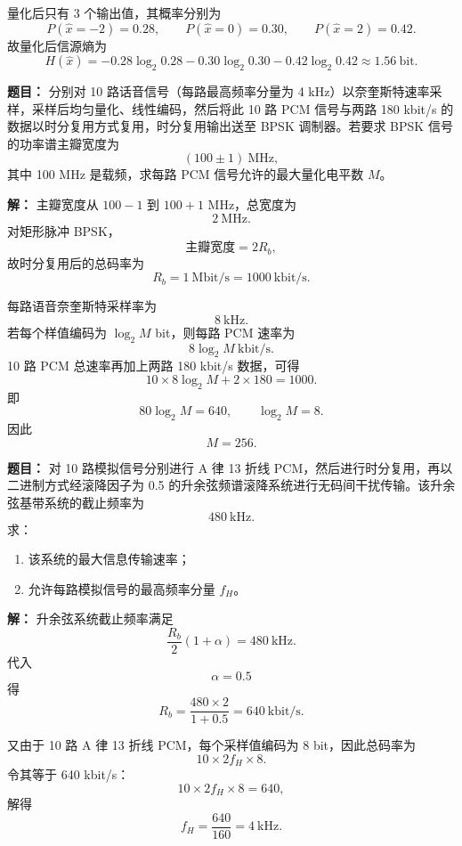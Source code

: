 量化后只有 3 个输出值，其概率分别为
\[
P(\hat x=-2)=0.28,\qquad P(\hat x=0)=0.30,\qquad P(\hat x=2)=0.42.
\]
故量化后信源熵为
\[
H(\hat x)=-0.28\log_2 0.28-0.30\log_2 0.30-0.42\log_2 0.42\approx 1.56\ \text{bit}.
\]

\medskip
{}
\textbf{题目：}
分别对 10 路话音信号（每路最高频率分量为 4 kHz）以奈奎斯特速率采样，采样后均匀量化、线性编码，然后将此 10 路 PCM 信号与两路 180 kbit/s 的数据以时分复用方式复用，时分复用输出送至 BPSK 调制器。若要求 BPSK 信号的功率谱主瓣宽度为
\[
(100\pm 1)\ \text{MHz},
\]
其中 100 MHz 是载频，求每路 PCM 信号允许的最大量化电平数 $M$。

\par\textbf{解：}
主瓣宽度从 $100-1$ 到 $100+1$ MHz，总宽度为
\[
2\ \text{MHz}.
\]
对矩形脉冲 BPSK，
\[
\text{主瓣宽度}=2R_b,
\]
故时分复用后的总码率为
\[
R_b=1\ \text{Mbit/s}=1000\ \text{kbit/s}.
\]

每路语音奈奎斯特采样率为
\[
8\ \text{kHz}.
\]
若每个样值编码为 $\log_2 M$ bit，则每路 PCM 速率为
\[
8\log_2 M\ \text{kbit/s}.
\]
10 路 PCM 总速率再加上两路 180 kbit/s 数据，可得
\[
10\times 8\log_2 M+2\times 180=1000.
\]
即
\[
80\log_2 M=640,
\qquad
\log_2 M=8.
\]
因此
\[
M=256.
\]

\medskip
{}
\textbf{题目：}
对 10 路模拟信号分别进行 A 律 13 折线 PCM，然后进行时分复用，再以二进制方式经滚降因子为 0.5 的升余弦频谱滚降系统进行无码间干扰传输。该升余弦基带系统的截止频率为
\[
480\ \text{kHz}.
\]
求：
\begin{enumerate}
\item 该系统的最大信息传输速率；
\item 允许每路模拟信号的最高频率分量 $f_H$。
\end{enumerate}

\par\textbf{解：}
升余弦系统截止频率满足
\[
\frac{R_b}{2}(1+\alpha)=480\ \text{kHz}.
\]
代入
\[
\alpha=0.5
\]
得
\[
R_b=\frac{480\times 2}{1+0.5}=640\ \text{kbit/s}.
\]

又由于 10 路 A 律 13 折线 PCM，每个采样值编码为 8 bit，因此总码率为
\[
10\times 2f_H\times 8.
\]
令其等于 640 kbit/s：
\[
10\times 2f_H\times 8=640,
\]
解得
\[
f_H=\frac{640}{160}=4\ \text{kHz}.
\]

\medskip
